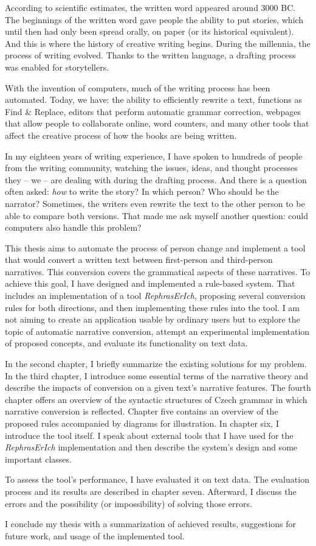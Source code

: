 According to scientific estimates, the written word appeared around 3000 BC. The beginnings of the written word gave people the ability to put stories, which until then had only been spread orally, on paper (or its historical equivalent). And this is where the history of creative writing begins. During the millennia, the process of writing evolved. Thanks to the written language, a drafting process was enabled for storytellers.

With the invention of computers, much of the writing process has been automated. Today, we have: the ability to efficiently rewrite a text, functions as Find \& Replace, editors that perform automatic grammar correction, webpages that allow people to collaborate online, word counters, and many other tools that affect the creative process of how the books are being written.

In my eighteen years of writing experience, I have spoken to hundreds of people from the writing community, watching the issues, ideas, and thought processes they -- we -- are dealing with during the drafting process. And there is a question often asked: \emph{how} to write the story? In which person? Who should be the narrator? Sometimes, the writers even rewrite the text to the other person to be able to compare both versions. That made me ask myself another question: could computers also handle this problem?

This thesis aims to automate the process of person change and implement a tool that would convert a written text between first-person and third-person narratives. This conversion covers the grammatical aspects of these narratives. To achieve this goal, I have designed and implemented a rule-based system. That includes an implementation of a tool \emph{RephrasErIch}, proposing several conversion rules for both directions, and then implementing these rules into the tool. I am not aiming to create an application usable by ordinary users but to explore the topic of automatic narrative conversion, attempt an experimental implementation of proposed concepts, and evaluate its functionality on text data.

In the second chapter, I briefly summarize the existing solutions for my problem. In the third chapter, I introduce some essential terms of the narrative theory and describe the impacts of conversion on a given text's narrative features. The fourth chapter offers an overview of the syntactic structures of Czech grammar in which narrative conversion is reflected. Chapter five contains an overview of the proposed rules accompanied by diagrams for illustration. In chapter six, I introduce the tool itself. I speak about external tools that I have used for the \emph{RephrasErIch} implementation and then describe the system's design and some important classes.

To assess the tool's performance, I have evaluated it on text data. The evaluation process and its results are described in chapter seven. Afterward, I discuss the errors and the possibility (or impossibility) of solving those errors.

I conclude my thesis with a summarization of achieved results, suggestions for future work, and usage of the implemented tool.

